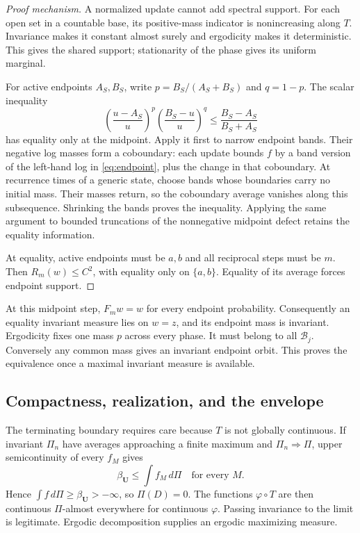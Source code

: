 \documentclass[letterpaper,twoside]{article}
\begin{document}
\begin{proof}[Proof mechanism]
A normalized update cannot add spectral support. For each open set in a countable base, its positive-mass indicator is nonincreasing along $T$. Invariance makes it constant almost surely and ergodicity makes it deterministic. This gives the shared support; stationarity of the phase gives its uniform marginal.

For active endpoints $A_S,B_S$, write $p=B_S/(A_S+B_S)$ and $q=1-p$. The scalar inequality
\begin{equation}\label{eq:endpoint}
 \left(\frac{u-A_S}{u}\right)^p
 \left(\frac{B_S-u}{u}\right)^q
 \le\frac{B_S-A_S}{B_S+A_S}
\end{equation}
has equality only at the midpoint. Apply it first to narrow endpoint bands. Their negative log masses form a coboundary: each update bounds $f$ by a band version of the left-hand log in \cref{eq:endpoint}, plus the change in that coboundary. At recurrence times of a generic state, choose bands whose boundaries carry no initial mass. Their masses return, so the coboundary average vanishes along this subsequence. Shrinking the bands proves the inequality. Applying the same argument to bounded truncations of the nonnegative midpoint defect retains the equality information.

At equality, active endpoints must be $a,b$ and all reciprocal steps must be $m$. Then $R_m(w)\le C^2$, with equality only on $\{a,b\}$. Equality of its average forces endpoint support.
\end{proof}

At this midpoint step, $F_mw=w$ for every endpoint probability. Consequently an equality invariant measure lies on $w=z$, and its endpoint mass is invariant. Ergodicity fixes one mass $p$ across every phase. It must belong to all $\mathcal B_j$. Conversely any common mass gives an invariant endpoint orbit. This proves the equivalence once a maximal invariant measure is available.

\subsection{Compactness, realization, and the envelope}
The terminating boundary requires care because $T$ is not globally continuous. If invariant $\Pi_n$ have averages approaching a finite maximum and $\Pi_n\Rightarrow\Pi$, upper semicontinuity of every $f_M$ gives
\[
 \beta_{\bm U}\le\int f_M\,d\Pi\quad\text{for every }M.
\]
Hence $\int f\,d\Pi\ge\beta_{\bm U}>-\infty$, so $\Pi(D)=0$. The functions $\varphi\circ T$ are then continuous $\Pi$-almost everywhere for continuous $\varphi$. Passing invariance to the limit is legitimate. Ergodic decomposition supplies an ergodic maximizing measure.
\end{document}
